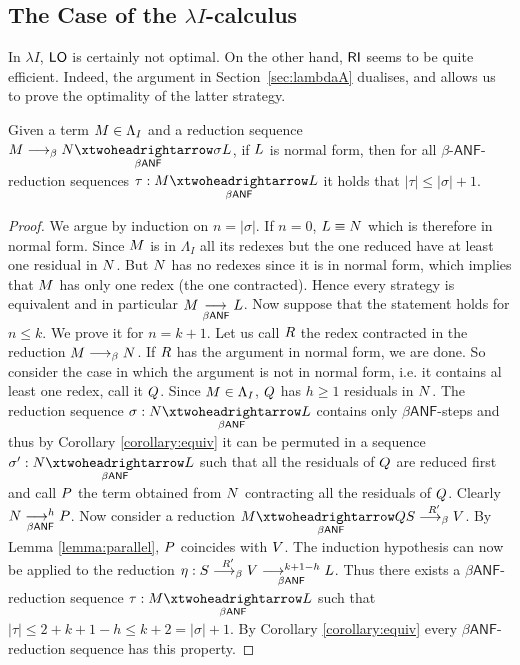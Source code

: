 \subsection{The Case of the $\lambda I$-calculus}
In $\lambda I$, $\textsf{LO}$ is certainly not optimal. On the other hand, $\textsf{RI}$ seems to be
quite efficient. Indeed, the argument in Section~\ref{sec:lambdaA} dualises, and allows us to prove
the optimality of the latter strategy.
\begin{lemma}\label{lemma:insertion}
	Given a term $M\in\Lambda_I$ and a reduction sequence $\termone\redbeta\termtwo\redbetaredanf{\sigma}\termthree$, if $L$ is normal form, then for all $\beta$-$\mathsf{ANF}$-reduction sequences $\tau:\termone\redbetaredanf{}\termthree$ it holds that $|\tau|\leq |\sigma|+1$.
\end{lemma}
\begin{LONG}
	\begin{proof}
		We argue by induction on $n=|\sigma|$. If $n=0$, $L\equiv N$ which is therefore in normal form. Since $M$ is in $\Lambda_I$ all its redexes but the one reduced have at least one residual in $N$. But $N$ has no redexes since it is in normal form, which implies that $M$ has only one redex (the one contracted). Hence every strategy is equivalent and in particular $M\underset{\beta\textsf{ANF}}{\longrightarrow^{}}L$. Now suppose that the statement holds for $n\leq k$. We prove it for $n=k+1$. Let us call $R$ the redex contracted in the reduction $M\longrightarrow_\beta N$. If $R$ has the argument in normal form, we are done. So consider the case in which the argument is not in normal form, i.e. it contains al least one redex, call it $Q$. Since $M\in\Lambda_I$, $Q$ has $h\geq 1$ residuals in $N$. The reduction sequence $\sigma: \termtwo\redbetaredanf{} \termthree$ contains only $\beta\mathsf{ANF}$-steps and thus by Corollary \ref{corollary:equiv} it can be permuted in a sequence $\sigma':\termtwo\redbetaredanf{} \termthree$ such that all the residuals of $Q$ are reduced first and call $P$ the term obtained from $N$ contracting all the residuals of $Q$. Clearly $N\underset{\beta\textsf{ANF}}{\longrightarrow^{h}}P$. Now consider a reduction $\termone\redbetaredanf{\rdxtwo}\termfive\redbetardx{\rdxone'}\termsix$. By Lemma \ref{lemma:parallel}, $P$ coincides with $V$. The induction hypothesis can now be applied to the reduction $\eta:S\overset{R'}{\longrightarrow_\beta}V\underset{\beta\textsf{ANF}}{\longrightarrow^{k+1-h}}L$. Thus there exists a $\beta\mathsf{ANF}$-reduction sequence $\tau:\termone\redbetaredanf{}\termthree$ such that $|\tau|\leq 2+k+1-h\leq k+2=|\sigma|+1$. By Corollary \ref{corollary:equiv} every $\beta\mathsf{ANF}$-reduction sequence has this property. 
	\end{proof}
\end{LONG}
